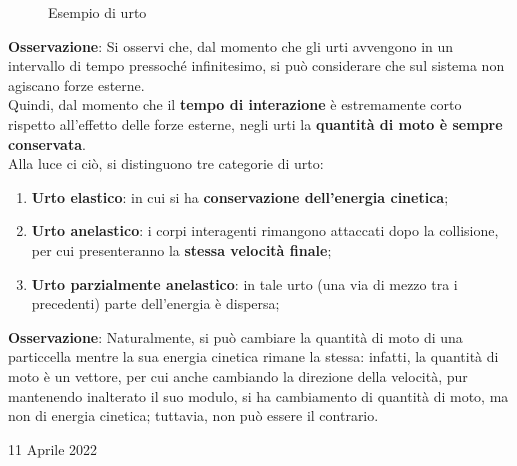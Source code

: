 \documentclass[a4paper]{extarticle}
\begin{document}
\begin{figure}[H]
  \caption{Esempio di urto}
  \label{fig:esempio_di_urto}
\end{figure}

\vspace{1em}
\noindent
\textbf{Osservazione}: Si osservi che, dal momento che gli urti avvengono in un intervallo di tempo pressoché infinitesimo, si può considerare che sul sistema non agiscano forze esterne.\\
Quindi, dal momento che il \textbf{tempo di interazione} è estremamente corto rispetto all'effetto delle forze esterne, negli urti la \textbf{quantità di moto è sempre conservata}.\\
Alla luce ci ciò, si distinguono tre categorie di urto:
\begin{enumerate}
  \item \textbf{Urto elastico}: in cui si ha \textbf{conservazione dell'energia cinetica};
  \item \textbf{Urto anelastico}: i corpi interagenti rimangono attaccati dopo la collisione, per cui presenteranno la \textbf{stessa velocità finale};
  \item \textbf{Urto parzialmente anelastico}: in tale urto (una via di mezzo tra i precedenti) parte dell'energia è dispersa;
\end{enumerate}

\vspace{1em}
\noindent
\textbf{Osservazione}: Naturalmente, si può cambiare la quantità di moto di una particcella mentre la sua energia cinetica rimane la stessa: infatti, la quantità di moto è un vettore, per cui anche cambiando la direzione della velocità, pur mantenendo inalterato il suo modulo, si ha cambiamento di quantità di moto, ma non di energia cinetica; tuttavia, non può essere il contrario.

\newpage
\noindent
\begin{center}
  11 Aprile 2022
\end{center}
\end{document}
